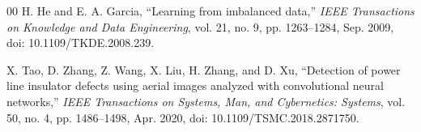 \documentclass[conference]{IEEEtran}
\begin{document}
\begin{thebibliography}{00}
 H. He and E. A. Garcia, ``Learning from imbalanced data,'' \textit{IEEE Transactions on Knowledge and Data Engineering}, vol. 21, no. 9, pp. 1263--1284, Sep. 2009, doi: 10.1109/TKDE.2008.239.

 X. Tao, D. Zhang, Z. Wang, X. Liu, H. Zhang, and D. Xu, ``Detection of power line insulator defects using aerial images analyzed with convolutional neural networks,'' \textit{IEEE Transactions on Systems, Man, and Cybernetics: Systems}, vol. 50, no. 4, pp. 1486--1498, Apr. 2020, doi: 10.1109/TSMC.2018.2871750.
\end{thebibliography}
\end{document}
